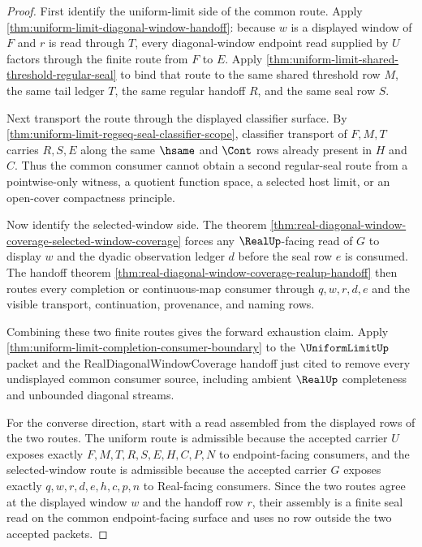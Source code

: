 \begin{proof}
First identify the uniform-limit side of the common route. Apply \autoref{thm:uniform-limit-diagonal-window-handoff}: because $w$ is a displayed window of $F$ and $r$ is read through $T$, every diagonal-window endpoint read supplied by $U$ factors through the finite route from $F$ to $E$. Apply \autoref{thm:uniform-limit-shared-threshold-regular-seal} to bind that route to the same shared threshold row $M$, the same tail ledger $T$, the same regular handoff $R$, and the same seal row $S$.

Next transport the route through the displayed classifier surface. By \autoref{thm:uniform-limit-regseq-seal-classifier-scope}, classifier transport of $F,M,T$ carries $R,S,E$ along the same $\hsame$ and $\Cont$ rows already present in $H$ and $C$. Thus the common consumer cannot obtain a second regular-seal route from a pointwise-only witness, a quotient function space, a selected host limit, or an open-cover compactness principle.

Now identify the selected-window side. The theorem \autoref{thm:real-diagonal-window-coverage-selected-window-coverage} forces any $\RealUp$-facing read of $G$ to display $w$ and the dyadic observation ledger $d$ before the seal row $e$ is consumed. The handoff theorem \autoref{thm:real-diagonal-window-coverage-realup-handoff} then routes every completion or continuous-map consumer through $q,w,r,d,e$ and the visible transport, continuation, provenance, and naming rows.

Combining these two finite routes gives the forward exhaustion claim. Apply \autoref{thm:uniform-limit-completion-consumer-boundary} to the $\UniformLimitUp$ packet and the RealDiagonalWindowCoverage handoff just cited to remove every undisplayed common consumer source, including ambient $\RealUp$ completeness and unbounded diagonal streams.

For the converse direction, start with a read assembled from the displayed rows of the two routes. The uniform route is admissible because the accepted carrier $U$ exposes exactly $F,M,T,R,S,E,H,C,P,N$ to endpoint-facing consumers, and the selected-window route is admissible because the accepted carrier $G$ exposes exactly $q,w,r,d,e,h,c,p,n$ to Real-facing consumers. Since the two routes agree at the displayed window $w$ and the handoff row $r$, their assembly is a finite seal read on the common endpoint-facing surface and uses no row outside the two accepted packets.
\end{proof}


